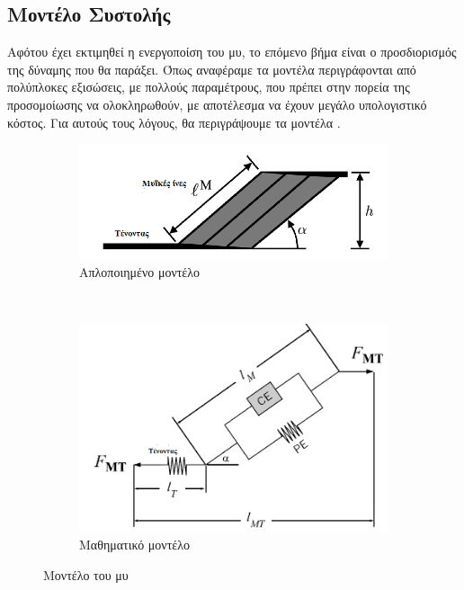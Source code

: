 \subsection{Μοντέλο Συστολής}

Αφότου έχει εκτιμηθεί η ενεργοποίση  του μυ, το επόμενο βήμα είναι ο προσδιορισμός της δύναμης που θα παράξει. Όπως αναφέραμε τα μοντέλα  περιγράφονται από πολύπλοκες εξισώσεις, με πολλούς παραμέτρους, που πρέπει στην πορεία της προσομοίωσης να ολοκληρωθούν, με αποτέλεσμα να έχουν μεγάλο υπολογιστικό κόστος. Για αυτούς τους λόγους, θα περιγράψουμε τα μοντέλα .

\begin{figure}[H]
    \centering
    \begin{subfigure}[Η]{.5\textwidth}
        \includegraphics[width=\textwidth]{neuromusculoskeletal/fig/simple-muscle-model.png}
        \caption{Απλοποιημένο μοντέλο\cite{millard13}}
        \label{fig:simple-mascle-model}
    \end{subfigure} ~
    \begin{subfigure}[Η]{.4\textwidth}
        \includegraphics[width=\textwidth]{neuromusculoskeletal/fig/muscle-model.png}
        \caption{Μαθηματικό μοντέλο\cite{erdemir07}}
        \label{fig:muscle-model}
    \end{subfigure}
    \caption{Μοντέλο του μυ}
\end{figure}

